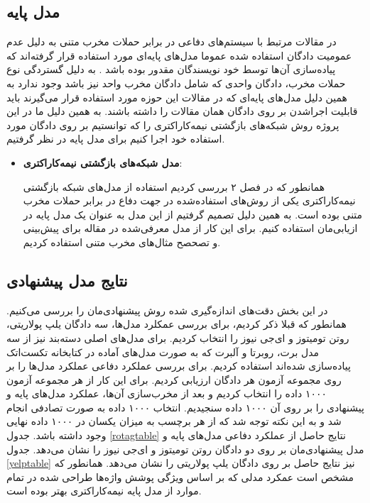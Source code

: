 \subsection{مدل‌ پایه}
در مقالات مرتبط با سیستم‌های دفاعی در برابر حملات مخرب متنی به دلیل عدم عمومیت دادگان استفاده ‌شده عموما مدل‌های پایه‌ای مورد استفاده قرار گرفته‌اند که پیاده‌سازی آن‌ها توسط خود نویسندگان مقدور بوده باشد
\citep{jones2020robust, zhou2019learning, wang2019natural}.
 به دلیل گستردگی نوع حملات مخرب، دادگان واحدی که شامل دادگان مخرب واحد نیز باشد وجود ندارد به همین دلیل مدل‌های پایه‌ای که در مقالات این حوزه مورد استفاده قرار می‌گیرند باید قابلیت اجراشدن بر روی دادگان همان مقالات را داشته باشند. به همین دلیل ما در این پروژه روش شبکه‌های بازگشتی نیمه‌کاراکتری را که توانستیم بر روی دادگان مورد استفاده خود اجرا کنیم برای مدل‌ پایه در نظر گرفتیم.
\begin{itemize}
	\item{\textbf{مدل شبکه‌های بازگشتی نیمه‌کاراکتری}}:
	
	همانطور که در فصل ۲ بررسی کردیم استفاده از مدل‌های شبکه بازگشتی نیمه‌کاراکتری یکی از روش‌های استفاده‌‌شده در جهت دفاع در برابر حملات مخرب متنی بوده است. به همین دلیل تصمیم گرفتیم از این مدل به عنوان یک مدل پایه در ازیابی‌مان استفاده کنیم. برای این کار از مدل معرفی‌شده در مقاله \cite{sakaguchi2017robsut} برای پیش‌بینی و تصحصح مثال‌های مخرب متنی استفاده کردیم.
\end{itemize}

\subsection{نتایج مدل پیشنهادی}
در این بخش دقت‌های اندازه‌گیری شده روش پیشنهادی‌مان را بررسی می‌کنیم. همانطور که قبلا ذکر کردیم، برای بررسی عمکلرد مدل‌‌ها، سه دادگان یلپ پولاریتی، روتن تومیتوز و ای‌جی نیوز را انتخاب کردیم. برای مدل‌های اصلی دسته‌بند نیز از سه مدل برت، روبرتا و آلبرت که به صورت مدل‌های آماده در کتابخانه تکست‌اتک پیاده‌سازی شده‌اند استفاده کردیم. برای بررسی عملکرد دفاعی عملکرد مدل‌ها را بر روی مجموعه آزمون هر دادگان ارزیابی کردیم. برای این کار از هر مجموعه آزمون ۱۰۰۰ داده را انتخاب کردیم و بعد از مخرب‌سازی آن‌ها، عملکرد مدل‌های پایه و پیشنهادی را بر روی آن ۱۰۰۰ داده سنجیدیم. انتخاب ۱۰۰۰ داده به صورت تصادفی انجام شد و به این نکته توجه شد که از هر برچسب به میزان یکسان در ۱۰۰۰ داده نهایی وجود داشته باشد. جدول \ref{rotagtable} نتایج حاصل از عملکرد دفاعی مدل‌های پایه و مدل پیشنهادی‌مان بر روی دو دادگان روتن تومیتوز و ای‌جی‌ نیوز را نشان می‌دهد. جدول \ref{yelptable} نیز نتایج حاصل بر روی دادگان یلپ پولاریتی را نشان می‌دهد. همانطور که مشخص است عمکرد مدلی که بر اساس ویژگی پوشش واژه‌ها طراحی شده در تمام موارد از مدل پایه نیمه‌کاراکتری بهتر بوده است.


